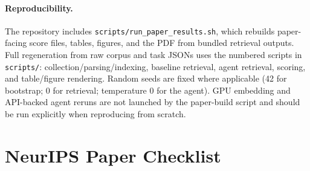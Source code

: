 \documentclass{article}
\begin{document}
\paragraph{Reproducibility.} The repository includes \texttt{scripts/run\_paper\_results.sh}, which rebuilds paper-facing score files, tables, figures, and the PDF from bundled retrieval outputs. Full regeneration from raw corpus and task JSONs uses the numbered scripts in \texttt{scripts/}: collection/parsing/indexing, baseline retrieval, agent retrieval, scoring, and table/figure rendering. Random seeds are fixed where applicable (42 for bootstrap; 0 for retrieval; temperature 0 for the agent). GPU embedding and API-backed agent reruns are not launched by the paper-build script and should be run explicitly when reproducing from scratch.

\section{NeurIPS Paper Checklist}
\label{app:checklist}
\end{document}

